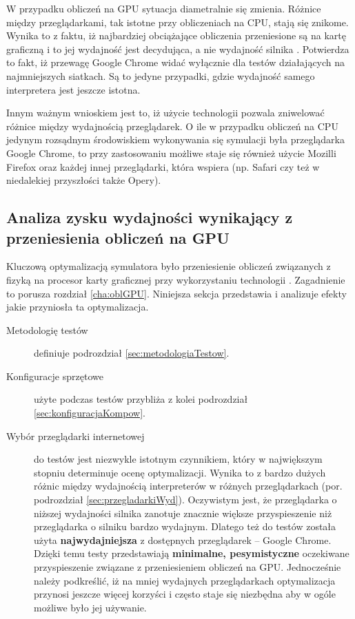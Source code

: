 W przypadku obliczeń na GPU sytuacja diametralnie się zmienia. Różnice między
przeglądarkami, tak istotne przy obliczeniach na CPU, stają się znikome. Wynika
to z faktu, iż najbardziej obciążające obliczenia przeniesione są na kartę
graficzną i to jej wydajność jest decydująca, a nie wydajność silnika
. Potwierdza to fakt, iż przewagę Google Chrome widać wyłącznie
dla testów działających na najmniejszych siatkach. Są to jedyne przypadki, 
gdzie wydajność samego interpretera  jest jeszcze istotna.

Innym ważnym wnioskiem jest to, iż użycie technologii  pozwala
zniwelować różnice między wydajnością przeglądarek. O ile w przypadku obliczeń
na CPU jedynym rozsądnym środowiskiem wykonywania się symulacji była
przeglądarka Google Chrome, to przy zastosowaniu  możliwe staje się
również użycie Mozilli Firefox oraz każdej innej przeglądarki, która wspiera
 (np. Safari czy też w niedalekiej przyszłości także Opery).

\subsection{Analiza zysku wydajności wynikający z przeniesienia obliczeń na GPU}
\label{sec:analizaGPUCPU}

Kluczową optymalizacją symulatora \en było przeniesienie obliczeń związanych z
fizyką na procesor karty graficznej przy wykorzystaniu technologii .
Zagadnienie to porusza rozdział \ref{cha:oblGPU}. Niniejsza sekcja przedstawia i
analizuje efekty jakie przyniosła ta optymalizacja.

\begin{description}

\item[Metodologię testów] definiuje podrozdział \ref{sec:metodologiaTestow}.

\item[Konfiguracje sprzętowe] użyte podczas testów przybliża z kolei podrozdział
\ref{sec:konfiguracjaKompow}.

\item[Wybór przeglądarki internetowej] do testów jest niezwykle istotnym
czynnikiem, który w największym stopniu determinuje ocenę optymalizacji. Wynika
to z bardzo dużych różnic między wydajnością interpreterów  w
różnych przeglądarkach (por. podrozdział \ref{sec:przegladarkiWyd}). Oczywistym
jest, że przeglądarka o niższej wydajności silnika  zanotuje
znacznie większe przyspieszenie niż przeglądarka o silniku bardzo wydajnym.
Dlatego też do testów została użyta \textbf{najwydajniejsza} z dostępnych
przeglądarek -- Google Chrome. Dzięki temu testy przedstawiają
\textbf{minimalne, pesymistyczne} oczekiwane przyspieszenie związane z
przeniesieniem obliczeń  na GPU. Jednocześnie należy podkreślić, iż na mniej
wydajnych przeglądarkach optymalizacja przynosi jeszcze więcej korzyści i 
często staje się niezbędna aby w ogóle możliwe było jej używanie.

\end{description}

